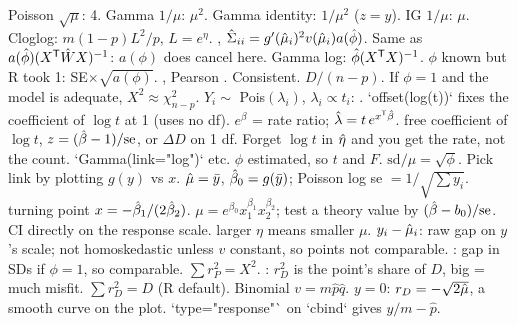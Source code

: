 \sk{} Poisson $\sqrt\mu$: 4. Gamma $1/\mu$: $\mu^2$. Gamma identity: $1/\mu^2$ ($z=y$). IG $1/\mu$: $\mu$. Cloglog: $m(1-p)L^2/p$, $L=e^\eta$.
\sk{} , $\hat\Sigma_{ii}=g'(\hat{\mu}_i)^2v(\hat{\mu}_i)a(\hat{\phi})$. Same as $a(\hat{\phi})(X^{\mathsf T}\hat WX)^{-1}$: $a(\phi)$ does  cancel here. Gamma log: $\hat{\phi}(X^{\mathsf T} X)^{-1}$. $\phi$ known but R took 1: SE$\times\sqrt{a(\phi)}$.
\sk{} , Pearson . Consistent.  $D/(n-p)$. If $\phi=1$ and the model is adequate, $X^2\approx\chi^2_{n-p}$.
\sk{} $Y_i\sim$ Pois$(\lambda_i)$, $\lambda_i\propto t_i$: . `offset(log(t))` fixes the coefficient of $\log t$ at 1 (uses no df). $e^{\beta}$ = rate ratio; $\hat\lambda=t\,e^{x^{\mathsf T}\hat{\beta}}$.  free coefficient of $\log t$, $z=(\hat{\beta}-1)/\mathrm{se}$, or $\Delta D$ on 1 df. Forget $\log t$ in $\hat{\eta}$ and you get the rate, not the count.
\sk{} `Gamma(link="log")` etc. $\phi$ estimated, so $t$ and $F$. $\mathrm{sd}/\mu=\sqrt\phi$. Pick link by plotting $g(y)$ vs $x$.
\sk{} $\hat{\mu}=\bar y$, $\hat{\beta}_0=g(\bar y)$; Poisson log se $=1/\sqrt{\sum y_i}$.  turning point $x=-\hat{\beta}_1/(2\hat{\beta}_2)$.  $\mu=e^{\beta_0}x_1^{\beta_1}x_2^{\beta_2}$; test a theory value by $(\hat{\beta}-b_0)/\mathrm{se}$.  CI directly on the response scale.  larger $\eta$ means smaller $\mu$.
\bx
{}  $y_i-\hat{\mu}_i$: raw gap on $y$'s scale; not homoskedastic unless $v$ constant, so points not comparable.  : gap in SDs if $\phi=1$, so comparable. $\sum r_P^2=X^2$.  : $r_D^2$ is the point's share of $D$, big = much misfit. $\sum r_D^2=D$ (R default). Binomial $v=m\hat p\hat q$. $y=0$: $r_D=-\sqrt{2\hat{\mu}}$, a smooth curve on the plot. `type="response"` on `cbind` gives $y/m-\hat p$.
